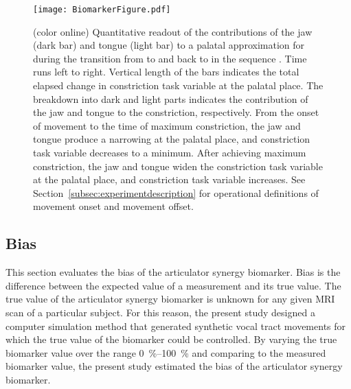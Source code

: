 \documentclass[preprint]{JASAnew}\usepackage[]{graphicx}\usepackage[]{color}
\begin{document}
\begin{figure}

\texttt{[image: BiomarkerFigure.pdf]}

\caption{(color online) Quantitative readout of the contributions of the jaw (dark bar) and tongue (light bar) to a palatal approximation for \textipa{[i]} during the transition from \textipa{[A]} to \textipa{[i]} and back to \textipa{[A]} in the sequence \textipa{[AiA]}. 
%
Time runs left to right.
%
Vertical length of the bars indicates the total elapsed change in constriction task variable at the palatal place.
%
The breakdown into dark and light parts indicates the contribution of the jaw and tongue to the constriction, respectively.
%
From the onset of movement to the time of maximum constriction, the jaw and tongue produce a narrowing at the palatal place, and constriction task variable decreases to a minimum. 
%
After achieving maximum constriction, the jaw and tongue widen the constriction task variable at the palatal place, and constriction task variable increases.
%
See Section~\ref{subsec:experimentdescription} for operational definitions of movement onset and movement offset.}
\label{fig:biomarkerFigure}%
\end{figure}





\subsection{Bias}
\label{subsec:bias}

This section evaluates the bias of the articulator synergy biomarker. Bias is the difference between the expected value of a measurement and its true value. The true value of the articulator synergy biomarker is unknown for any given MRI scan of a particular subject. For this reason, the present study designed a computer simulation method that generated synthetic vocal tract movements for which the true value of the biomarker could be controlled. By varying the true biomarker value over the range \SIrange{0}{100}{\percent} and comparing to the measured biomarker value, the present study estimated the bias of the articulator synergy biomarker.
\end{document}
